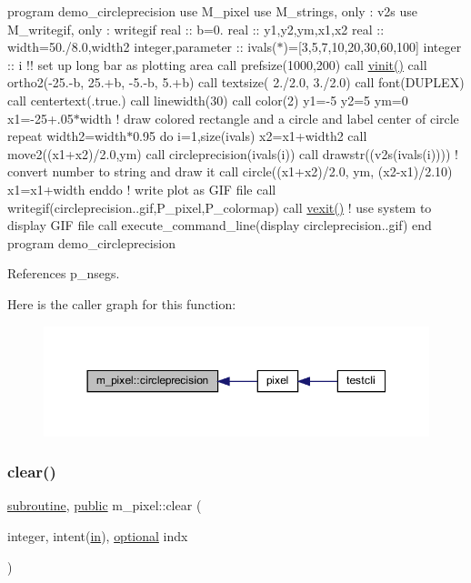 program demo\+\_\+circleprecision use M\+\_\+pixel use M\+\_\+strings, only \+: v2s use M\+\_\+writegif, only \+: writegif real \+:\+: b=0. real \+:\+: y1,y2,ym,x1,x2 real \+:\+: width=50./8.0,width2 integer,parameter \+:\+: ivals($\ast$)=\mbox{[}3,5,7,10,20,30,60,100\mbox{]} integer \+:\+: i !! set up long bar as plotting area call prefsize(1000,200) call \hyperlink{namespacem__pixel_ac03ca8f23fdadb60599b6ea4dc87a6d9}{vinit()} call ortho2(-\/25.-\/b, 25.+b, -\/5.-\/b, 5.+b) call textsize( 2./2.0, 3./2.0) call font(\textquotesingle{}D\+U\+P\+L\+EX\textquotesingle{}) call centertext(.true.) call linewidth(30) call color(2) y1=-\/5 y2=5 ym=0 x1=-\/25+.05$\ast$width ! draw colored rectangle and a circle and label center of circle repeat width2=width$\ast$0.95 do i=1,size(ivals) x2=x1+width2 call move2((x1+x2)/2.0,ym) call circleprecision(ivals(i)) call drawstr((v2s(ivals(i)))) ! convert number to string and draw it call circle((x1+x2)/2.0, ym, (x2-\/x1)/2.10) x1=x1+width enddo ! write plot as G\+IF file call writegif(\textquotesingle{}circleprecision..\+gif\textquotesingle{},P\+\_\+pixel,P\+\_\+colormap) call \hyperlink{namespacem__pixel_a19ad6b65752322b0029a62cc0ebec3e8}{vexit()} ! use system to display G\+IF file call execute\+\_\+command\+\_\+line(\textquotesingle{}display circleprecision..\+gif\textquotesingle{}) end program demo\+\_\+circleprecision 

References p\+\_\+nsegs.

Here is the caller graph for this function\+:
\nopagebreak
\begin{figure}[H]
\begin{center}
\leavevmode
\includegraphics[width=350pt]{namespacem__pixel_a68ca1be8f7a92ece6efce8d69987af9c_icgraph}
\end{center}
\end{figure}
\mbox{\label{namespacem__pixel_af3b81a21a0b2f6b5eddd09c031bd6173}} 
\subsubsection{\texorpdfstring{clear()}{clear()}}
{\footnotesize\ttfamily \hyperlink{M__stopwatch_83_8txt_acfbcff50169d691ff02d4a123ed70482}{subroutine}, \hyperlink{M__stopwatch_83_8txt_a2f74811300c361e53b430611a7d1769f}{public} m\+\_\+pixel\+::clear (\begin{DoxyParamCaption}\item[{integer, intent(\hyperlink{M__journal_83_8txt_afce72651d1eed785a2132bee863b2f38}{in}), \hyperlink{option__stopwatch_83_8txt_aa4ece75e7acf58a4843f70fe18c3ade5}{optional}}]{indx }\end{DoxyParamCaption})}



